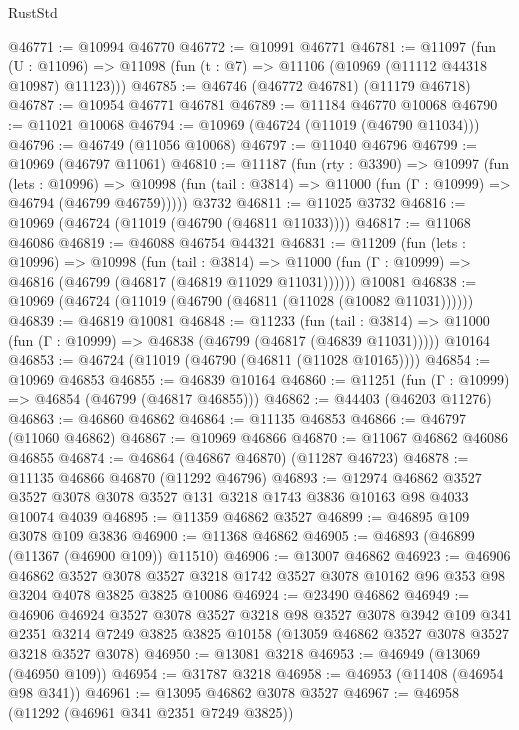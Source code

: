 \begin{lexlean}{RustStd}
\begin{coremodule}
@46771 := @10994 @46770
@46772 := @10991 @46771
@46781 := @11097
    (fun (U : @11096) => @11098 (fun (t : @7) => @11106 (@10969 (@11112 @44318 @10987) @11123)))
@46785 := @46746 (@46772 @46781) (@11179 @46718)
@46787 := @10954 @46771 @46781
@46789 := @11184 @46770 @10068
@46790 := @11021 @10068
@46794 := @10969 (@46724 (@11019 (@46790 @11034)))
@46796 := @46749 (@11056 @10068)
@46797 := @11040 @46796
@46799 := @10969 (@46797 @11061)
@46810 := @11187
    (fun (rty : @3390) =>
    @10997
      (fun (lets : @10996) =>
      @10998 (fun (tail : @3814) => @11000 (fun (Γ : @10999) => @46794 (@46799 @46759)))))
    @3732
@46811 := @11025 @3732
@46816 := @10969 (@46724 (@11019 (@46790 (@46811 @11033))))
@46817 := @11068 @46086
@46819 := @46088 @46754 @44321
@46831 := @11209
    (fun (lets : @10996) =>
    @10998
      (fun (tail : @3814) =>
      @11000 (fun (Γ : @10999) => @46816 (@46799 (@46817 (@46819 @11029 @11031))))))
    @10081
@46838 := @10969 (@46724 (@11019 (@46790 (@46811 (@11028 (@10082 @11031))))))
@46839 := @46819 @10081
@46848 := @11233
    (fun (tail : @3814) => @11000 (fun (Γ : @10999) => @46838 (@46799 (@46817 (@46839 @11031)))))
    @10164
@46853 := @46724 (@11019 (@46790 (@46811 (@11028 @10165))))
@46854 := @10969 @46853
@46855 := @46839 @10164
@46860 := @11251 (fun (Γ : @10999) => @46854 (@46799 (@46817 @46855)))
@46862 := @44403 (@46203 @11276)
@46863 := @46860 @46862
@46864 := @11135 @46853
@46866 := @46797 (@11060 @46862)
@46867 := @10969 @46866
@46870 := @11067 @46862 @46086 @46855
@46874 := @46864 (@46867 @46870) (@11287 @46723)
@46878 := @11135 @46866 @46870 (@11292 @46796)
@46893 := @12974
    @46862
    @3527
    @3527
    @3078
    @3078
    @3527
    @131
    @3218
    @1743
    @3836
    @10163
    @98
    @4033
    @10074
    @4039
@46895 := @11359 @46862 @3527
@46899 := @46895 @109 @3078 @109 @3836
@46900 := @11368 @46862
@46905 := @46893 (@46899 (@11367 (@46900 @109)) @11510)
@46906 := @13007 @46862
@46923 := @46906
    @46862
    @3527
    @3078
    @3527
    @3218
    @1742
    @3527
    @3078
    @10162
    @96
    @353
    @98
    @3204
    @4078
    @3825
    @3825
    @10086
@46924 := @23490 @46862
@46949 := @46906
    @46924
    @3527
    @3078
    @3527
    @3218
    @98
    @3527
    @3078
    @3942
    @109
    @341
    @2351
    @3214
    @7249
    @3825
    @3825
    @10158
    (@13059 @46862 @3527 @3078 @3527 @3218 @3527 @3078)
@46950 := @13081 @3218
@46953 := @46949 (@13069 (@46950 @109))
@46954 := @31787 @3218
@46958 := @46953 (@11408 (@46954 @98 @341))
@46961 := @13095 @46862 @3078 @3527
@46967 := @46958 (@11292 (@46961 @341 @2351 @7249 @3825))

\end{coremodule}
\end{lexlean}
